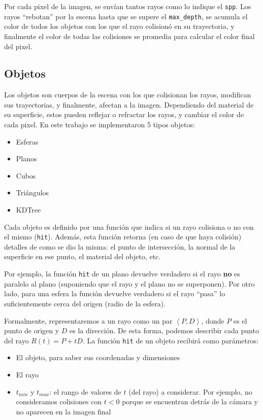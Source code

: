 Por cada pixel de la imagen, se envían tantos rayos como lo indique el
\texttt{spp}. Los rayos ``rebotan'' por la escena hasta que se supere el
\texttt{max\_depth}, se acumula el color de todos los objetos con los que el
rayo colisionó en su trayectoria, y finalmente el color de todas las colisiones
se promedia para calcular el color final del pixel.

\subsection{Objetos}

Los objetos son cuerpos de la escena con los que colisionan los rayos, modifican
sus trayectorias, y finalmente, afectan a la imagen. Dependiendo del material de
su superficie, estos pueden reflejar o refractar los rayos, y cambiar el color
de cada pixel. En este trabajo se implementaron 5 tipos objetos:

\begin{itemize}
  \item Esferas
  \item Planos
  \item Cubos
  \item Triángulos
  \item KDTree
\end{itemize}

Cada objeto es definido por una función que indica si un rayo colisiona o no con
el mismo (\texttt{hit}). Además, esta función retorna (en caso de que haya
colisión) detalles de como se dio la misma: el punto de intersección, la normal
de la superficie en ese punto, el material del objeto, etc.

Por ejemplo, la función \texttt{hit} de un plano devuelve verdadero si el rayo
\textbf{no} es paralelo al plano (suponiendo que el rayo y el plano no se
superponen). Por otro lado, para una esfera la función devuelve verdadero si el
rayo ``pasa'' lo suficientemente cerca del origen (radio de la esfera).

Formalmente, representaremos a un rayo como un par $\left\langle P, D
  \right\rangle$, donde $P$ es el punto de origen y $D$ es la dirección. De esta
forma, podemos describir cada punto del rayo $R(t) = P + tD$. La función
\texttt{hit} de un objeto recibirá como parámetros:

\begin{itemize}
  \item El objeto, para saber sus coordenadas y dimensiones
  \item El rayo
  \item $t_{min}$ y $t_{max}$: el rango de valores de $t$ (del rayo) a
        considerar. Por ejemplo, no consideramos colisiones con $t < 0$ porque
        se encuentran detrás de la cámara y no aparecen en la imagen final
\end{itemize}

